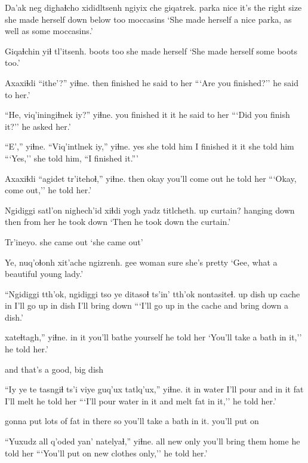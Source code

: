 \documentclass[12pt]{article}
\begin{document}
\gll Da'ak neg  dighaɬcho  xididltsenh      ngiyix che giqatrek.
parka nice {it's the right size} {she made herself} {down below} too moccasins
\glt `She made herself a nice parka, as well as some moccasins.'
\glend

\gll Giqaɬchin yiɬ tl'itsenh.
boots     too {she made herself}
\glt `She made herself some boots too.'
\glend

\gll Axaxiɬdi ``ithe'?''            yiɬne.
then     finished {he said to her}
\glt ```Are you finished?'' he said to her.'
\glend

\gll ``He, viq'iningiɬnek  iy?'' yiɬne.
{} {you finished it} it {he said to her}
\glt ```Did you finish it?'' he asked her.'
\glend

\gll ``E','' yiɬne.       ``Viq'intlnek   iy,'' yiɬne.
yes {she told him} {I finished it} it {she told him}
\glt ```Yes,'' she told him, ``I finished it.'''
\glend

\gll Axaxiɬdi ``agidet tr'itehoɬ,''       yiɬne. 
then     okay   {you'll come out} {he told her}
\glt ```Okay, come out,'' he told her.'
\glend

\gll Ngidiggi {satl'on nighech'id} xiɬdi yogh {yadz titlcheth. }
up       {curtain? hanging down} then  {from her} {he took down}
\glt `Then he took down the curtain.'
\glend

\gll Tr'ineyo.
{{she came out}}
\glt `she came out'
\glend

\gll Ye, nuq'oɬonh xit'ache ngizrenh.
gee woman     sure     {she's pretty}
\glt `Gee, what a beautiful young lady.'
\glend

\gll ``Ngidiggi tth'ok, ngidiggi tso   ye ditasoɬ ts'in' tth'ok nontasiteɬ.
up       dish    up       cache in {I'll go up} in  dish  {I'll bring down}
\glt ```I'll go up in the cache and bring down a dish.'
\glend

 xateɬtagh,''             yiɬne.
{in it}     {you'll bathe yourself} {he told her}
\glt `You'll take a bath in it,'' he told her.'
\glend

and that's a good, big dish

\gll ``Iy ye te    tasngiɬ   ts'i viye  guq'ux tatlq'ux,'' yiɬne.
it in  water {I'll pour} and  {in it} fat  {I'll melt} {he told her}
\glt ```I'll pour water in it and melt fat in it,'' he told her.'
\glend
              
gonna put lots of fat in there so you'll take a bath in it. you'll put on

\gll ``Yuxudz all q'oded yan' natelyaɬ,''   yiɬne.
all    {}  new    only {you'll bring them home} {he told her}
\glt ```You'll put on new clothes only,'' he told her.'
\glend
\end{document}
